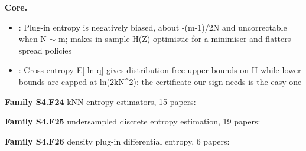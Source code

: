 \documentclass[10pt]{article}
\newcommand{\memb}[1]{\par\smallskip\textbf{#1}\quad}
\begin{document}
\memb{Core.}
\begin{itemize}[nosep,leftmargin=1.2em]
\item \citet{Paninski-estimation03}: Plug-in entropy is negatively biased, about -(m-1)/2N and uncorrectable when N \ensuremath{\sim} m; makes in-sample H(Z) optimistic for a minimiser and flatters spread policies
\item \citet{McAllester-formal20}: Cross-entropy E[-ln q] gives distribution-free upper bounds on H while lower bounds are capped at ln(2kN\^{}2): the certificate our sign needs is the easy one
\end{itemize}
\memb{Family S4.F24} kNN entropy estimators, 15 papers: {\footnotesize \citetext{\citealp{Kozachenko-sample87}; \citealp{Berrett-efficient19}; \citealp{Gao-demystifying18}; \citealp{Kraskov-estimating04}; \citealp{Singh-nearest03}; \citealp{Goria-new05}; \citealp{Nilsson-estimation07}; \citealp{Leonenko-class08}; \citealp{Wang-divergence09}; \citealp{Ajgl-differential11}; \citealp{Sricharan-ensemble13}; \citealp{Delattre-kozachenkoleonenko17}; \citealp{Singh-finitesample16}; \citealp{Jiao-nearest18}; \citealp{Lord-geometric18}}}

\memb{Family S4.F25} undersampled discrete entropy estimation, 19 papers: {\footnotesize \citetext{\citealp{Paninski-estimation03}; \citealp{Miller-note55}; \citealp{Nemenman-entropy01}; \citealp{Hausser-entropy09}; \citealp{Jiao-minimax14}; \citealp{Basharin-statistical59}; \citealp{Treves-upward95}; \citealp{Panzeri-analytical96}; \citealp{Strong-entropy98}; \citealp{Antos-convergence01}; \citealp{Chao-nonparametric03}; \citealp{Grassberger-entropy03}; \citealp{Schurmann-bias04}; \citealp{Vu-coverageadjusted07}; \citealp{Valiant-estimating11}; \citealp{Zhang-entropy12}; \citealp{Archer-bayesian14}; \citealp{Wu-minimax14}; \citealp{Han-does15}}}

\memb{Family S4.F26} density plug-in differential entropy, 6 papers: {\footnotesize \citetext{\citealp{Beirlant-nonparametric97}; \citealp{Ahmad-nonparametric76}; \citealp{Vasicek-test76}; \citealp{Joe-estimation89}; \citealp{Hall-estimation93}; \citealp{Kandasamy-nonparametric15}}}
\end{document}
